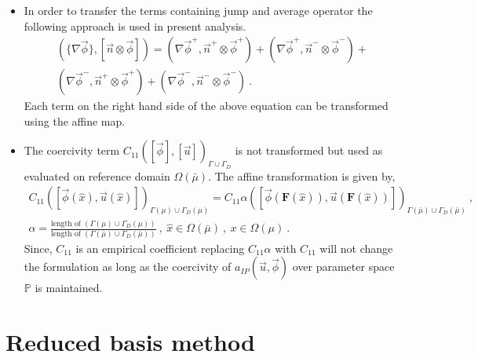 \documentclass[graybox]{svmult}
\begin{document}
\begin{itemize}
\item In order to transfer the terms containing jump and average operator the following approach is used in present analysis.
\begin{equation*}\label{jump_average_term_split}
\begin{split}
\left(\lbrace \nabla \overrightarrow{\phi} \rbrace , \left[ \overrightarrow{n} \otimes \overrightarrow{\phi}  \right]  \right) = \left( \nabla \overrightarrow{\phi}^+ , \overrightarrow{n}^+ \otimes \overrightarrow{\phi}^+ \right) + \left( \nabla \overrightarrow{\phi}^+ , \overrightarrow{n}^- \otimes \overrightarrow{\phi}^- \right) + \\ 
\left( \nabla \overrightarrow{\phi}^- , \overrightarrow{n}^+ \otimes \overrightarrow{\phi}^+ \right) + \left( \nabla \overrightarrow{\phi}^- , \overrightarrow{n}^- \otimes \overrightarrow{\phi}^- \right) \ .
\end{split}
\end{equation*}
Each term on the right hand side of the above equation can be transformed using the affine map.

\item The coercivity term $C_{11}\left( [\overrightarrow{\phi}],[\overrightarrow{u}] \right)_{\Gamma \cup \Gamma_D}$ is not transformed but used as evaluated on reference domain $\Omega(\bar{\mu})$. The affine transformation is given by,
\begin{equation*}
\begin{split}
C_{11}\left( [\overrightarrow{\phi}(\hat{x}),\overrightarrow{u}(\hat{x})] \right)_{\Gamma(\mu) \cup \Gamma_D(\mu)} = C_{11} \alpha \left( [\overrightarrow{\phi}(\bm{F}(\hat{x})),\overrightarrow{u}(\bm{F}(\hat{x}))] \right)_{\Gamma(\bar{\mu}) \cup \Gamma_D(\bar{\mu})} \ , \\
\alpha = \frac{\text{length of }\left( \Gamma(\mu) \cup \Gamma_D(\mu)\right)}{\text{length of }\left( \Gamma(\bar{\mu}) \cup \Gamma_D(\bar{\mu})\right)} \ , \ \hat{x} \in \Omega(\bar{\mu}) \ , \ x \in \Omega(\mu) \ .
\end{split}
\end{equation*}
Since, $C_{11}$ is an empirical coefficient replacing $C_{11} \alpha$ with $C_{11}$ will not change the formulation as long as the coercivity of $a_{IP}(\overrightarrow{u},\overrightarrow{\phi}) $ over parameter space $\mathbb{P}$ is maintained. 
\end{itemize}

\section{Reduced basis method}\label{rb_section}
\end{document}
